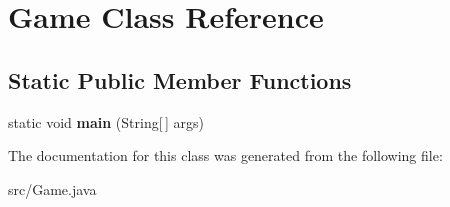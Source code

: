 \hypertarget{class_game}{}\section{Game Class Reference}
\label{class_game}
\subsection*{Static Public Member Functions}
\begin{DoxyCompactItemize}
\item 
\hypertarget{class_game_ae52595a27ac1b327b05db2129ad81fca}{}static void {\bfseries main} (String\mbox{[}$\,$\mbox{]} args)\label{class_game_ae52595a27ac1b327b05db2129ad81fca}

\end{DoxyCompactItemize}


The documentation for this class was generated from the following file\+:\begin{DoxyCompactItemize}
\item 
src/Game.\+java\end{DoxyCompactItemize}
